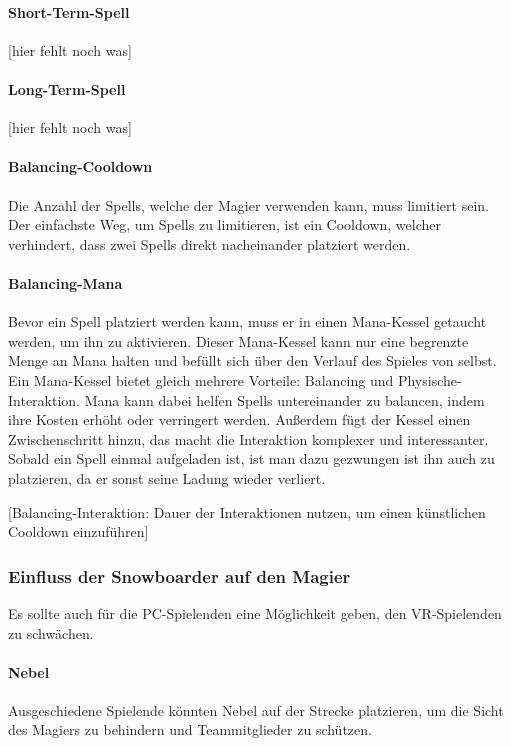 \paragraph{Short-Term-Spell}
[hier fehlt noch was]
\paragraph{Long-Term-Spell}
[hier fehlt noch was]

\paragraph{Balancing-Cooldown}
Die Anzahl der Spells, welche der Magier verwenden kann, muss limitiert sein. Der einfachste Weg, um Spells zu limitieren, ist ein Cooldown, welcher verhindert, dass  zwei Spells direkt nacheinander platziert werden.

\paragraph{Balancing-Mana}
Bevor ein Spell platziert werden kann, muss er in einen Mana-Kessel getaucht werden, um ihn zu aktivieren. Dieser Mana-Kessel kann nur eine begrenzte Menge an Mana halten und befüllt sich über den Verlauf des Spieles von selbst. Ein Mana-Kessel bietet gleich mehrere Vorteile: Balancing und Physische-Interaktion. Mana kann dabei helfen Spells untereinander zu balancen, indem ihre Kosten erhöht oder verringert werden. Außerdem fügt der Kessel einen Zwischenschritt hinzu, das macht die Interaktion komplexer und interessanter. Sobald ein Spell einmal aufgeladen ist, ist man dazu gezwungen ist ihn auch zu platzieren, da er sonst seine Ladung wieder verliert.

[Balancing-Interaktion: Dauer der Interaktionen nutzen, um einen künstlichen Cooldown einzuführen]

\subsubsection{Einfluss der Snowboarder auf den Magier}

Es sollte auch für die PC-Spielenden eine Möglichkeit geben, den VR-Spielenden zu schwächen.

\paragraph{Nebel}
Ausgeschiedene Spielende könnten Nebel auf der Strecke platzieren, um die Sicht des Magiers zu behindern und Teammitglieder zu schützen.

